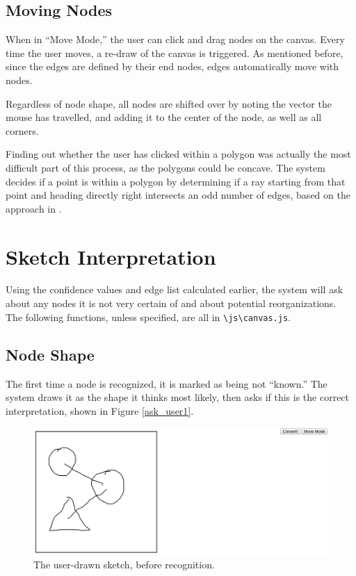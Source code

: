 \documentclass[12pt]{article}
\begin{document}
\subsection{Moving Nodes}
\par When in ``Move Mode,'' the user can click and drag nodes on the canvas. Every time the user moves, a re-draw of the canvas is triggered. As mentioned before, since the edges are defined by their end nodes, edges automatically move with nodes.\\
\par Regardless of node shape, all nodes are shifted over by noting the vector the mouse has travelled, and adding it to the center of the node, as well as all corners.\\
\par Finding out whether the user has clicked within a polygon was actually the most difficult part of this process, as the polygons could be concave. The system decides if a point is within a polygon by determining if a ray starting from that point and heading directly right intersects an odd number of edges, based on the approach in \cite{doIntersect}.

\section{Sketch Interpretation}
Using the confidence values and edge list calculated earlier, the system will ask about any nodes it is not very certain of and about potential reorganizations. The following functions, unless specified, are all in \texttt{\textbackslash js\textbackslash canvas.js}.
\subsection{Node Shape}
\par The first time a node is recognized, it is marked as being not ``known.'' The system draws it as the shape it thinks most likely, then asks if this is the correct interpretation, shown in Figure \ref{ask_user1}.

\begin{figure}
\includegraphics[width=\textwidth]{sketch.png}
\caption{The user-drawn sketch, before recognition.}
\label{sketch}
\end{figure}
\end{document}
